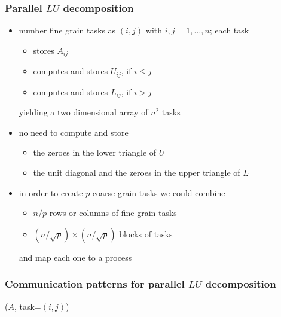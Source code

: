 \begin{frame}[fragile]
%
  \frametitle{Parallel $LU$ decomposition}
%
  \begin{itemize}
%
  \item number fine grain tasks as $(i,j)$ with $i,j = 1, \ldots, n$; each task
    \begin{itemize}
    \item stores $A_{ij}$
    \item computes and stores $U_{ij}$, if $i \leq j$
    \item computes and stores $L_{ij}$, if $i > j$
    \end{itemize}
    yielding a two dimensional array of $n^{2}$ tasks
%
  \item no need to compute and store
    \begin{itemize}
    \item the zeroes in the lower triangle of $U$
    \item the unit diagonal and the zeroes in the upper triangle of $L$
    \end{itemize}
%
  \item in order to create $p$ coarse grain tasks we could combine
    \begin{itemize}
    \item $n/p$ rows or columns of fine grain tasks
    \item $(n/\sqrt{p}) \times (n/\sqrt{p})$ blocks of tasks
    \end{itemize}
    and map each one to a process
%
  \end{itemize}
% 
\end{frame}

\begin{frame}[fragile]
%
  \frametitle{Communication patterns for parallel $LU$ decomposition}
%
  \begin{center}
    \begin{minipage}{.85\linewidth}
      \begin{algorithm}[H]
        \label{alg:pLU-ij}
%
        \dontprintsemicolon
        \setalcaphskip{0ex}
%
        \caption{\lu($A$, task=$(i,j)$)}
%
         
% 
      \end{algorithm}
    \end{minipage}
  \end{center}
%
\end{frame}

